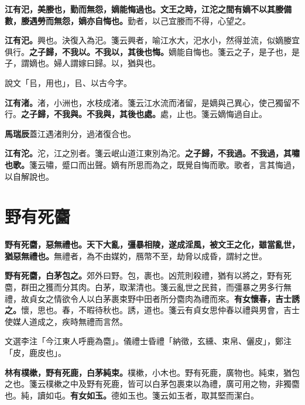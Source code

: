 \textbf{江有汜，美媵也，勤而無怨，嫡能悔過也。文王之時，江沱之間有嫡不以其媵備數，媵遇勞而無怨，嫡亦自悔也。}{\footnotesize 勤者，以己宜媵而不得，心望之。}

\textbf{江有汜。}{\footnotesize 興也。決復入為汜。箋云興者，喻江水大，汜水小，然得並流，似嫡媵宜俱行。}\textbf{之子歸，不我以。不我以，其後也悔。}{\footnotesize 嫡能自悔也。箋云之子，是子也，是子，謂嫡也。婦人謂嫁曰歸。以，猶與也。}

\begin{quoting}說文「㠯，用也」，㠯、以古今字。\end{quoting}

\textbf{江有渚。}{\footnotesize 渚，小洲也，水枝成渚。箋云江水流而渚留，是嫡與己異心，使己獨留不行。}\textbf{之子歸，不我與。不我與，其後也處。}{\footnotesize 處，止也。箋云嫡悔過自止。}

\begin{quoting}\textbf{馬瑞辰}蓋江遇渚則分，過渚復合也。\end{quoting}

\textbf{江有沱。}{\footnotesize 沱，江之別者。箋云岷山道江東別為沱。}\textbf{之子歸，不我過。不我過，其嘯也歌。}{\footnotesize 箋云嘯，蹙口而出聲。嫡有所思而為之，既覺自悔而歌。歌者，言其悔過，以自解說也。}

\section{野有死麕}


\textbf{野有死麕，惡無禮也。天下大亂，彊暴相陵，遂成淫風，被文王之化，雖當亂世，猶惡無禮也。}{\footnotesize 無禮者，為不由媒妁，鴈幣不至，劫脅以成昏，謂紂之世。}

\textbf{野有死麕，白茅包之。}{\footnotesize 郊外曰野。包，裹也。凶荒則殺禮，猶有以將之，野有死麕，群田之獲而分其肉。白茅，取潔清也。箋云亂世之民貧，而彊暴之男多行無禮，故貞女之情欲令人以白茅裹束野中田者所分麕肉為禮而來。}\textbf{有女懷春，吉士誘之。}{\footnotesize 懷，思也。春，不暇待秋也。誘，道也。箋云有貞女思仲春以禮與男會，吉士使媒人道成之，疾時無禮而言然。}

\begin{quoting}文選李注「今江東人呼鹿為麕」。儀禮士昏禮「納徵，玄纁、束帛、儷皮」，鄭注「皮，鹿皮也」。\end{quoting}

\textbf{林有樸樕，野有死鹿，白茅純束。}{\footnotesize 樸樕，小木也。野有死鹿，廣物也。純束，猶包之也。箋云樸樕之中及野有死鹿，皆可以白茅包裹束以為禮，廣可用之物，非獨麕也。純，讀如屯。}\textbf{有女如玉。}{\footnotesize 德如玉也。箋云如玉者，取其堅而潔白。}

